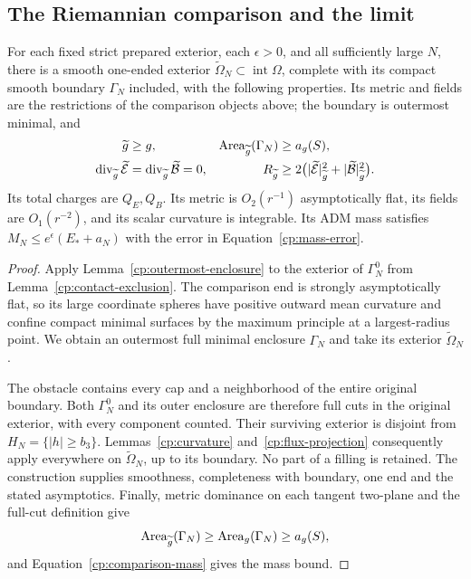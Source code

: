 \subsection{The Riemannian comparison and the limit}

\begin{proposition}\label{cp:charged-comparison}
For each fixed strict prepared exterior, each $\epsilon>0$, and all
sufficiently large $N$, there is a smooth one-ended exterior
$\widetilde\Omega_N\subset\operatorname{int}\Omega$, complete with
its compact smooth boundary $\Gamma_N$ included, with the following
properties.  Its metric and fields are the restrictions of the
comparison objects above; the boundary is outermost minimal, and
\begin{align}
 \widetilde g&\ge g,
 &\operatorname{Area}_{\widetilde g}(\Gamma_N)&\ge a_g(S),
       \label{cp:comparison-area}\\
 \operatorname{div}_{\widetilde g}\widetilde{\mathcal E}
 &=\operatorname{div}_{\widetilde g}\widetilde{\mathcal B}=0,
 &R_{\widetilde g}&\ge
   2\bigl(|\widetilde{\mathcal E}|_{\widetilde g}^2
          +|\widetilde{\mathcal B}|_{\widetilde g}^2\bigr).
       \label{cp:comparison-dec}
\end{align}
Its total charges are $Q_E,Q_B$.  Its metric is $O_2(r^{-1})$
asymptotically flat, its fields are $O_1(r^{-2})$, and its scalar
curvature is integrable.  Its ADM mass satisfies
$M_N\le e^\epsilon(E_*+a_N)$ with the error in
Equation~\eqref{cp:mass-error}.
\end{proposition}

\begin{proof}
Apply Lemma~\ref{cp:outermost-enclosure} to the exterior of
$\Gamma_N^0$ from Lemma~\ref{cp:contact-exclusion}.  The comparison
end is strongly asymptotically flat, so its large coordinate spheres
have positive outward mean curvature and confine compact minimal
surfaces by the maximum principle at a largest-radius point.  We
obtain an outermost full minimal enclosure $\Gamma_N$ and take its
exterior $\widetilde\Omega_N$.

The obstacle contains every cap and a neighborhood of the entire
original boundary.  Both $\Gamma_N^0$ and its outer enclosure are
therefore full cuts in the original exterior, with every component
counted.  Their surviving exterior is disjoint from
$H_N=\{|h|\ge b_3\}$.  Lemmas~\ref{cp:curvature}
and~\ref{cp:flux-projection} consequently apply everywhere on
$\widetilde\Omega_N$, up to its boundary.  No part of a filling is
retained.  The construction supplies smoothness, completeness with
boundary, one end and the stated asymptotics.  Finally, metric
dominance on each tangent two-plane and the full-cut definition give
\[
 \operatorname{Area}_{\widetilde g}(\Gamma_N)
 \ge\operatorname{Area}_g(\Gamma_N)\ge a_g(S),
\]
and Equation~\eqref{cp:comparison-mass} gives the mass bound.
\end{proof}

